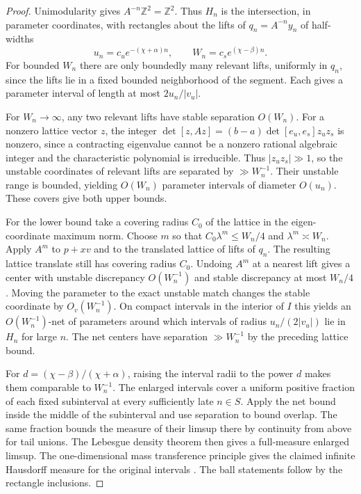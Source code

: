 \documentclass[11pt,a4paper,reqno]{amsart}
\theoremstyle{definition}
\theoremstyle{remark}
\numberwithin{equation}{section}
\begin{document}
\begin{proof}
Unimodularity gives \(A^{-n}\mathbb Z^2=\mathbb Z^2\). Thus \(H_n\)
is the intersection, in parameter coordinates, with rectangles
about the lifts of \(q_n=A^{-n}y_n\) of half-widths
\begin{equation}\label{eq:inverse-slice-widths}
 u_n=c_u e^{-(\chi+\alpha)n},\qquad W_n=c_s e^{(\chi-\beta)n}.
\end{equation}
For bounded \(W_n\) there are only
boundedly many relevant lifts, uniformly in \(q_n\), since the lifts
lie in a fixed bounded neighborhood of the segment. Each gives a
parameter interval of length at most \(2u_n/|v_u|\).

For \(W_n\to\infty\), any two relevant lifts have stable
separation \(O(W_n)\). For a nonzero lattice vector \(z\), the
integer \(\det[z,Az]=(b-a)\det[e_u,e_s]z_u z_s\) is nonzero,
since a contracting eigenvalue cannot be a nonzero rational
algebraic integer and the characteristic polynomial is irreducible.
Thus \(|z_u z_s|\gg1\), so the unstable coordinates of relevant
lifts are separated by \(\gg W_n^{-1}\). Their unstable range is
bounded, yielding \(O(W_n)\) parameter intervals of diameter
\(O(u_n)\). These covers give both upper bounds.

For the lower bound take a covering radius \(C_0\) of the lattice in
the eigen-coordinate maximum norm. Choose \(m\) so that
\(C_0\lambda^m\le W_n/4\) and \(\lambda^m\asymp W_n\).
Apply \(A^m\) to \(p+xv\) and to the translated lattice of lifts of
\(q_n\). The resulting lattice translate still has covering radius
\(C_0\). Undoing \(A^m\) at a nearest lift gives a center with
unstable discrepancy \(O(W_n^{-1})\) and stable discrepancy at most
\(W_n/4\). Moving the parameter to the exact unstable match changes
the stable coordinate by \(O_v(W_n^{-1})\). On compact intervals in
the interior of \(I\) this yields an \(O(W_n^{-1})\)-net of
parameters around which intervals of radius \(u_n/(2|v_u|)\) lie
in \(H_n\) for large \(n\). The net centers have separation
\(\gg W_n^{-1}\) by the preceding lattice bound.

For \(d=(\chi-\beta)/(\chi+\alpha)\), raising the interval radii to
the power \(d\) makes them comparable to \(W_n^{-1}\). The enlarged
intervals cover a uniform positive fraction of each fixed subinterval
at every sufficiently late \(n\in S\). Apply the net bound inside
the middle of the subinterval and use separation to bound overlap.
The same fraction bounds the measure of their limsup there by
continuity from above for tail unions. The Lebesgue density theorem
then gives a full-measure enlarged limsup. The one-dimensional mass
transference principle gives the claimed infinite Hausdorff measure
for the original intervals \cite[Theorem~2]{BV}. The ball statements
follow by the rectangle inclusions.
\end{proof}
\end{document}
